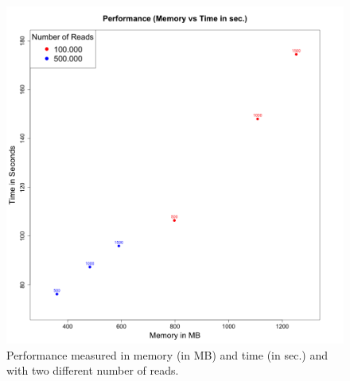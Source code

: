 \documentclass[10pt,a4paper]{article}
\begin{document}
\newpage
\begin{figure}[!ht]
\centering
\label{fig:performance}
\includegraphics[width=\textwidth]{../output/plots/plotPerformance}
\caption{\footnotesize Performance measured in memory (in MB) and time (in sec.) and with two different number of reads.}
\end{figure}
\end{document}
